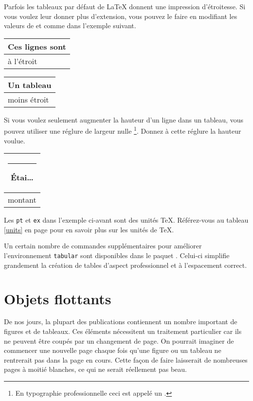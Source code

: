 Parfois les tableaux par défaut de \LaTeX{} donnent une impression
d'étroitesse. Si vous voulez leur donner plus d'extension, vous pouvez
le faire en modifiant les valeurs de  et  comme
dans l'exemple suivant.

\begin{example}
\begin{tabular}{|l|}
\hline
Ces lignes sont\\\hline
à l'étroit\\\hline
\end{tabular}

{\renewcommand{\arraystretch}{1.5}
\renewcommand{\tabcolsep}{0.2cm}
\begin{tabular}{|l|}
\hline
Un tableau\\\hline
moins étroit\\\hline
\end{tabular}}

\end{example}

Si vous voulez seulement augmenter la hauteur d'un ligne dans un
tableau, vous pouvez utiliser une réglure de largeur nulle
\footnote{En typographie professionnelle ceci est appelé un
.}. Donnez à cette réglure la hauteur voulue.

\begin{example}
\begin{tabular}{|c|}
\hline
\rule{1pt}{4ex}\'Etai\dots\\
\hline
\rule{0pt}{4ex} montant \\
\hline
\end{tabular}
\end{example}

Les \texttt{pt} et \texttt{ex} dans l'exemple ci-avant sont des unités
\TeX. Référez-vous au tableau \ref{units} en page \pageref{units} pour
en savoir plus sur les unités de \TeX.

Un certain nombre de commandes supplémentaires pour améliorer
l'environnement \texttt{tabular} sont disponibles dans le paquet
. Celui-ci simplifie grandement la création de tables
d'aspect professionnel et à l'espacement correct.


\section{Objets flottants}

De nos jours, la plupart des publications contiennent un nombre
important de figures et de tableaux. Ces éléments nécessitent un
traitement particulier car ils ne peuvent être coupés par un
changement de page. On pourrait imaginer de commencer une nouvelle
page chaque fois qu'une figure ou un tableau ne rentrerait pas dans la
page en cours. Cette façon de faire laisserait de nombreuses pages à moitié
blanches, ce qui ne serait réellement pas beau.

